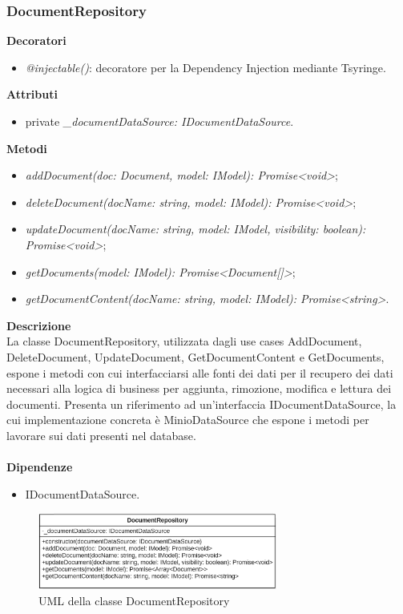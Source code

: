 \subsubsection{DocumentRepository}
\textbf{Decoratori}
\begin{itemize}
    \item \textit{@injectable()}: decoratore per la Dependency Injection mediante Tsyringe.
\end{itemize}
\textbf{Attributi}
\begin{itemize}
    \item private \textit{\_documentDataSource: IDocumentDataSource}.
\end{itemize}
\textbf{Metodi}
\begin{itemize}[itemsep=-4pt]
    \item \textit{addDocument(doc: Document, model: IModel): Promise<void>};
    \item \textit{deleteDocument(docName: string, model: IModel): Promise<void>};
    \item \textit{updateDocument(docName: string, model: IModel, visibility: boolean): Promise<void>};
    \item \textit{getDocuments(model: IModel): Promise<Document[]>};
    \item \textit{getDocumentContent(docName: string, model: IModel): Promise<string>}. 
\end{itemize}
\textbf{Descrizione}\\
La classe DocumentRepository, utilizzata dagli use cases AddDocument, DeleteDocument, UpdateDocument, GetDocumentContent e GetDocuments, espone i metodi con cui interfacciarsi alle fonti dei dati per il recupero dei dati necessari alla logica di business per aggiunta, rimozione, modifica e lettura dei documenti. Presenta un riferimento ad un'interfaccia IDocumentDataSource, la cui implementazione concreta è MinioDataSource che espone i metodi per lavorare sui dati presenti nel database.\\ \\
\textbf{Dipendenze}
\begin{itemize}
    \item IDocumentDataSource.
\end{itemize}

\begin{figure}[h!]
    \centering  
    \includegraphics[width=0.7\textwidth]{DocumentRepository.png}
    \caption{UML della classe DocumentRepository}
\end{figure}

